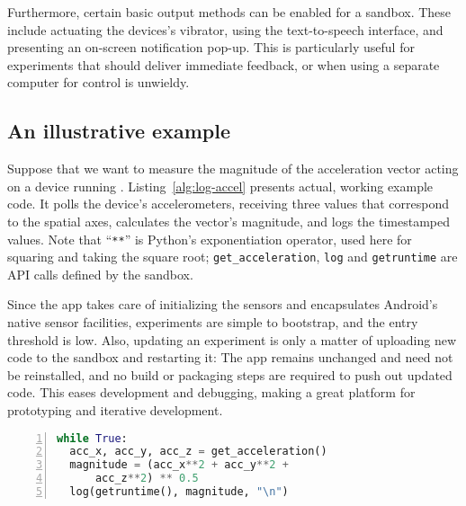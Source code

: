 Furthermore, certain basic output methods can be enabled for a sandbox. 
These include actuating the devices's vibrator, using the text-to-speech 
interface, and presenting an on-screen notification pop-up.
This is particularly useful for 
experiments that should deliver immediate feedback, or when using a separate 
computer for control is unwieldy.


\subsection{An illustrative example}

Suppose that we want to measure the magnitude of the acceleration 
vector acting on a device running \sys.
Listing~\ref{alg:log-accel} presents actual, working example code.
It polls the device's accelerometers, receiving three values that correspond 
to the spatial axes, calculates the vector's magnitude, and logs the 
timestamped values. Note that ``\texttt{**}'' is Python's exponentiation 
operator, used here for squaring and taking the square root; 
\texttt{get\_acceleration}, \texttt{log} and \texttt{getruntime} are 
API calls defined by the \sys sandbox.

Since the \sys app takes care of initializing the sensors and encapsulates 
Android's native sensor facilities, experiments are simple to bootstrap, 
and the entry threshold is low. Also, updating an experiment is only a 
matter of uploading new code to the sandbox and restarting it: The \sys 
app remains unchanged and need not be reinstalled, and no build or 
packaging steps are required to push out updated code. This eases 
development and debugging, making \sys a great platform for prototyping 
and iterative development.

\begin{lstlisting}[language=Python,float,numbers=left,basicstyle=\small,emph={get_acceleration,log,getruntime},xleftmargin=2em,emphstyle=\textit,label=alg:log-accel,caption=\textsc{Code sample: Log the magnitude of acceleration}]
while True:
  acc_x, acc_y, acc_z = get_acceleration()
  magnitude = (acc_x**2 + acc_y**2 + 
      acc_z**2) ** 0.5
  log(getruntime(), magnitude, "\n")
\end{lstlisting}
